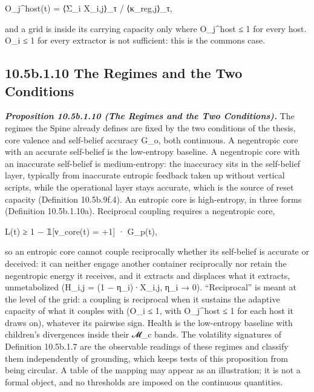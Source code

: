 \documentclass[
]{article}
\begin{document}
O\_j\^{}host(t) = ⟨Σ\_i X\_i,j⟩\_τ / ⟨κ\_reg,j⟩\_τ,

and a grid is inside its carrying capacity only where O\_j\^{}host ≤ 1
for every host. O\_i ≤ 1 for every extractor is not sufficient: this is
the commons case.

\hypertarget{b.1.10-the-regimes-and-the-two-conditions}{%
\subsection{10.5b.1.10 The Regimes and the Two
Conditions}\label{b.1.10-the-regimes-and-the-two-conditions}}

\emph{\textbf{Proposition 10.5b.1.10 (The Regimes and the Two
Conditions).}} The regimes the Spine already defines are fixed by the
two conditions of the thesis, core valence and self-belief accuracy
G\_o, both continuous. A negentropic core with an accurate self-belief
is the low-entropy baseline. A negentropic core with an inaccurate
self-belief is medium-entropy: the inaccuracy sits in the self-belief
layer, typically from inaccurate entropic feedback taken up without
vertical scripts, while the operational layer stays accurate, which is
the source of reset capacity (Definition 10.5b.9f.4). An entropic core
is high-entropy, in three forms (Definition 10.5b.1.10a). Reciprocal
coupling requires a negentropic core,

L(t) ≥ 1 − 𝟙{[}ν\_core(t) = +1{]} · G\_p(t),

so an entropic core cannot couple reciprocally whether its self-belief
is accurate or deceived: it can neither engage another container
reciprocally nor retain the negentropic energy it receives, and it
extracts and displaces what it extracts, unmetabolized (H\_i,j = (1 −
η\_i)·X\_i,j, η\_i → 0). ``Reciprocal'' is meant at the level of the
grid: a coupling is reciprocal when it sustains the adaptive capacity of
what it couples with (O\_i ≤ 1, with O\_j\^{}host ≤ 1 for each host it
draws on), whatever its pairwise sign. Health is the low-entropy
baseline with children's divergences inside their 𝓜\_c bands. The
volatility signatures of Definition 10.5b.1.7 are the observable
readings of these regimes and classify them independently of grounding,
which keeps tests of this proposition from being circular. A table of
the mapping may appear as an illustration; it is not a formal object,
and no thresholds are imposed on the continuous quantities.
\end{document}
